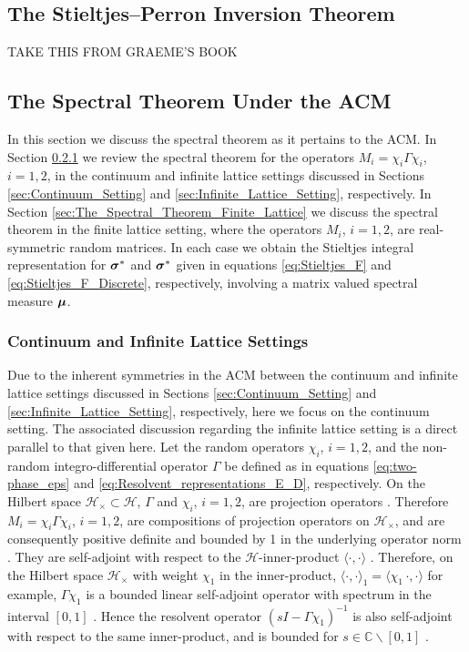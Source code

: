 \documentclass{cmslatex}
\newcommand\bsig{\mbox{\boldmath${\sigma}$}}
\newcommand\bmu{\mbox{\boldmath${\mu}$}}
\begin{document}
\subsection{The Stieltjes--Perron Inversion Theorem}
\label{sec:Stieltjes-Perron}
TAKE THIS FROM GRAEME'S BOOK

\subsection{The Spectral Theorem Under the ACM}
\label{sec:The_Spectral_Theorem}
%
In this section we discuss the spectral theorem
\cite{Reed-1980,Stone:64} as it pertains to the ACM. In Section
\ref{sec:The_Spectral_Theorem_Continuum} we review the spectral
theorem for the operators  $M_i=\chi_i\Gamma\chi_i$, $i=1,2$, in the continuum
and infinite lattice settings discussed in Sections
\ref{sec:Continuum_Setting} and \ref{sec:Infinite_Lattice_Setting},
respectively.  In Section
\ref{sec:The_Spectral_Theorem_Finite_Lattice} we discuss the spectral
theorem in the finite lattice setting, where the operators $M_i$,
$i=1,2$, are real-symmetric random matrices. In each case we obtain
the Stieltjes integral representation for $\bsig^*$ and $\bsig^*$
given in equations \eqref{eq:Stieltjes_F} and
\eqref{eq:Stieltjes_F_Discrete}, respectively, involving a matrix
valued spectral measure $\bmu$.     
%
\subsubsection{Continuum  and Infinite Lattice Settings}
\label{sec:The_Spectral_Theorem_Continuum} 
%
Due to the inherent symmetries in the ACM between the continuum and
infinite lattice settings discussed in Sections
\ref{sec:Continuum_Setting} and \ref{sec:Infinite_Lattice_Setting},
respectively, here we focus on the continuum setting. The
associated discussion regarding the infinite lattice setting is a
direct parallel to that given here. Let the random operators $\chi_i$,
$i=1,2$, and the non-random integro-differential operator $\Gamma$ be
defined as in equations \eqref{eq:two-phase_eps} and
\eqref{eq:Resolvent_representations_E_D}, respectively. On the Hilbert
space $\mathscr{H}_\times\subset\mathscr{H}$, $\Gamma$ and $\chi_i$, $i=1,2$, are
projection operators \cite{Golden:CMP-473}. Therefore $M_i=\chi_i\Gamma\chi_i$, 
$i=1,2$, are compositions of projection operators on $\mathscr{H}_\times$,
and are consequently positive definite and bounded by 1 in the
underlying operator norm \cite{Rudin:87}. They 
are self-adjoint with respect to the $\mathscr{H}$-inner-product
$\langle\cdot,\cdot\rangle$ \cite{Golden:CMP-473}. Therefore, on the Hilbert space
$\mathscr{H}_\times$ with weight $\chi_1$ in the inner-product,
$\langle\cdot,\cdot\rangle_1=\langle\chi_1\,\cdot,\cdot\rangle$ for example, $\Gamma\chi_1$ is a bounded linear
self-adjoint operator with spectrum in the interval $[0,1]$
\cite{Golden:CMP-473}. Hence the resolvent operator $(sI-\Gamma\chi_1)^{-1}$
is also self-adjoint with respect to the same inner-product, and is
bounded for $s\in\mathbb{C}\backslash[0,1]$ \cite{Stone:64}.   
\end{document}
